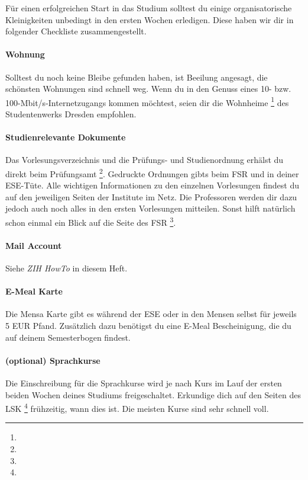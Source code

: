 
Für einen erfolgreichen Start in das Studium solltest du einige organisatorische Kleinigkeiten unbedingt in den ersten Wochen erledigen.
Diese haben wir dir in folgender Checkliste zusammengestellt.


\paragraph{Wohnung}
Solltest du noch keine Bleibe gefunden haben, ist Beeilung angesagt, die schönsten Wohnungen sind schnell weg.
Wenn du in den Genuss eines 10- bzw. 100-Mbit/s-Internetzugangs kommen möchtest, seien dir die Wohnheime \footnote{} des Studentenwerks Dresden empfohlen.

\paragraph{Studienrelevante Dokumente}
Das Vorlesungsverzeichnis und die Prüfungs- und Studienordnung erhälst du direkt beim Prüfungsamt \footnote{}.
Gedruckte Ordnungen gibts beim FSR und in deiner ESE-Tüte.
Alle wichtigen Informationen zu den einzelnen Vorlesungen findest du auf den jeweiligen Seiten der Institute im Netz.
Die Professoren werden dir dazu jedoch auch noch alles in den ersten Vorlesungen mitteilen. Sonst hilft natürlich schon einmal ein Blick auf die Seite des FSR \footnote{}.

\paragraph{Mail Account}
Siehe \textit{ZIH HowTo} in diesem Heft.

\paragraph{E-Meal Karte}
Die Mensa Karte gibt es während der ESE oder in den Mensen selbst für jeweils 5 EUR Pfand.
Zusätzlich dazu benötigst du eine E-Meal Bescheinigung, die du auf deinem Semesterbogen findest.

\paragraph{(optional) Sprachkurse}
Die Einschreibung für die Sprachkurse wird je nach Kurs im Lauf der ersten beiden Wochen deines Studiums freigeschaltet.
Erkundige dich auf den Seiten des LSK \footnote{} frühzeitig, wann dies ist. Die meisten Kurse sind sehr schnell voll.

